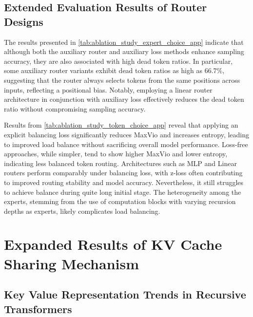 \subsection{Extended Evaluation Results of Router Designs}


The results presented in \autoref{tab:ablation_study_expert_choice_app} indicate that although both the auxiliary router and auxiliary loss methods enhance sampling accuracy, they are also associated with high dead token ratios. In particular, some auxiliary router variants exhibit dead token ratios as high as 66.7\%, suggesting that the router always selects tokens from the same positions across inputs, reflecting a positional bias. Notably, employing a linear router architecture in conjunction with auxiliary loss effectively reduces the dead token ratio without compromising sampling accuracy.


Results from \autoref{tab:ablation_study_token_choice_app} reveal that applying an explicit balancing loss significantly reduces MaxVio and increases entropy, leading to improved load balance without sacrificing overall model performance. Loss-free approaches, while simpler, tend to show higher MaxVio and lower entropy, indicating less balanced token routing. Architectures such as MLP and Linear routers perform comparably under balancing loss, with z-loss often contributing to improved routing stability and model accuracy. Nevertheless, it still struggles to achieve balance during quite long initial stage. The heterogeneity among the experts, stemming from the use of computation blocks with varying recursion depths as experts, likely complicates load balancing.








\section{Expanded Results of KV Cache Sharing Mechanism}
\label{app:expanded_kv}

\subsection{Key Value Representation Trends in Recursive Transformers}

